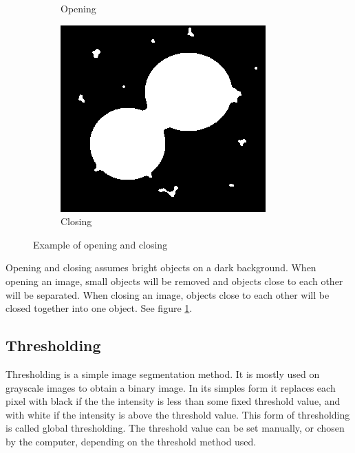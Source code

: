 \begin{figure}[h]
\begin{subfigure}{.33\textwidth}
        \caption{Opening}
    \end{subfigure}%
    \begin{subfigure}{.33\textwidth}
        \centering
        \includegraphics[width=.99\linewidth]{images/literature/morphological/closing}
        \caption{Closing}
    \end{subfigure}
    \caption{Example of opening and closing}
    \label{fig:dots_opening_closing}
\end{figure}

Opening and closing assumes bright objects on a dark background. When opening an image, small objects will be removed and objects close to each other will be separated. When closing an image, objects close to each other will be closed together into one object. See figure \ref{fig:dots_opening_closing}.




\newpage
\subsection{Thresholding}

Thresholding is a simple image segmentation method. It is mostly used on grayscale images to obtain a binary image. In its simples form it replaces each pixel with black if the the intensity is less than some fixed threshold value, and with white if the intensity is above the threshold value. This form of thresholding is called global thresholding.\cite{website:thresholding}\cite{website:wiki_threshold}
The threshold value can be set manually, or chosen by the computer, depending on the threshold method used. 

